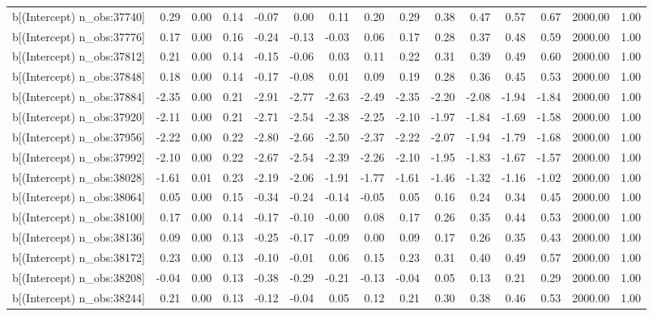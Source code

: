 \begin{table}[ht]
\begin{tabular}{rrrrrrrrrrrrrrr}
  b[(Intercept) n\_obs:37740] & 0.29 & 0.00 & 0.14 & -0.07 & 0.00 & 0.11 & 0.20 & 0.29 & 0.38 & 0.47 & 0.57 & 0.67 & 2000.00 & 1.00 \\ 
  b[(Intercept) n\_obs:37776] & 0.17 & 0.00 & 0.16 & -0.24 & -0.13 & -0.03 & 0.06 & 0.17 & 0.28 & 0.37 & 0.48 & 0.59 & 2000.00 & 1.00 \\ 
  b[(Intercept) n\_obs:37812] & 0.21 & 0.00 & 0.14 & -0.15 & -0.06 & 0.03 & 0.11 & 0.22 & 0.31 & 0.39 & 0.49 & 0.60 & 2000.00 & 1.00 \\ 
  b[(Intercept) n\_obs:37848] & 0.18 & 0.00 & 0.14 & -0.17 & -0.08 & 0.01 & 0.09 & 0.19 & 0.28 & 0.36 & 0.45 & 0.53 & 2000.00 & 1.00 \\ 
  b[(Intercept) n\_obs:37884] & -2.35 & 0.00 & 0.21 & -2.91 & -2.77 & -2.63 & -2.49 & -2.35 & -2.20 & -2.08 & -1.94 & -1.84 & 2000.00 & 1.00 \\ 
  b[(Intercept) n\_obs:37920] & -2.11 & 0.00 & 0.21 & -2.71 & -2.54 & -2.38 & -2.25 & -2.10 & -1.97 & -1.84 & -1.69 & -1.58 & 2000.00 & 1.00 \\ 
  b[(Intercept) n\_obs:37956] & -2.22 & 0.00 & 0.22 & -2.80 & -2.66 & -2.50 & -2.37 & -2.22 & -2.07 & -1.94 & -1.79 & -1.68 & 2000.00 & 1.00 \\ 
  b[(Intercept) n\_obs:37992] & -2.10 & 0.00 & 0.22 & -2.67 & -2.54 & -2.39 & -2.26 & -2.10 & -1.95 & -1.83 & -1.67 & -1.57 & 2000.00 & 1.00 \\ 
  b[(Intercept) n\_obs:38028] & -1.61 & 0.01 & 0.23 & -2.19 & -2.06 & -1.91 & -1.77 & -1.61 & -1.46 & -1.32 & -1.16 & -1.02 & 2000.00 & 1.00 \\ 
  b[(Intercept) n\_obs:38064] & 0.05 & 0.00 & 0.15 & -0.34 & -0.24 & -0.14 & -0.05 & 0.05 & 0.16 & 0.24 & 0.34 & 0.45 & 2000.00 & 1.00 \\ 
  b[(Intercept) n\_obs:38100] & 0.17 & 0.00 & 0.14 & -0.17 & -0.10 & -0.00 & 0.08 & 0.17 & 0.26 & 0.35 & 0.44 & 0.53 & 2000.00 & 1.00 \\ 
  b[(Intercept) n\_obs:38136] & 0.09 & 0.00 & 0.13 & -0.25 & -0.17 & -0.09 & 0.00 & 0.09 & 0.17 & 0.26 & 0.35 & 0.43 & 2000.00 & 1.00 \\ 
  b[(Intercept) n\_obs:38172] & 0.23 & 0.00 & 0.13 & -0.10 & -0.01 & 0.06 & 0.15 & 0.23 & 0.31 & 0.40 & 0.49 & 0.57 & 2000.00 & 1.00 \\ 
  b[(Intercept) n\_obs:38208] & -0.04 & 0.00 & 0.13 & -0.38 & -0.29 & -0.21 & -0.13 & -0.04 & 0.05 & 0.13 & 0.21 & 0.29 & 2000.00 & 1.00 \\ 
  b[(Intercept) n\_obs:38244] & 0.21 & 0.00 & 0.13 & -0.12 & -0.04 & 0.05 & 0.12 & 0.21 & 0.30 & 0.38 & 0.46 & 0.53 & 2000.00 & 1.00 \\ 

\end{tabular}
\end{table}
